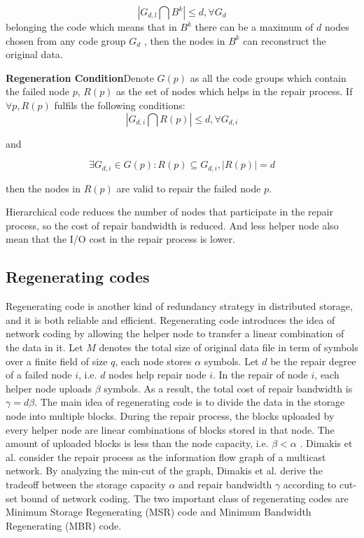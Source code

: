 \documentclass{article} %
\begin{document}
$$|G_{d, l} \bigcap B^k| \le d, \forall G_d$$
belonging the code which means that in $B^k$  there can be a maximum of $d$ nodes chosen from any code group $G_d$ , then the nodes in $B^k$ can reconstruct the original data.

\textbf{Regeneration Condition}Denote $G(p)$ as all the code groups which contain the failed node $p$, $R(p)$ as the set of nodes which helps in the repair process. If $\forall p, R(p)$ fulfils the following conditions:
$$|G_{d, i} \bigcap R(p)| \le d, \forall G_{d, i}$$

and 

$$\exists G_{d, i} \in G(p) : R(p) \subseteq G_{d, i}, |R(p)| = d$$

then the nodes in $R(p)$ are valid to repair the failed node $p$.

Hierarchical code reduces the number of nodes that participate in the repair process, so the cost of repair bandwidth is reduced. And less helper node also mean that the I/O cost in the repair process is lower.

\subsection{Regenerating codes}
Regenerating code is another kind of redundancy strategy in distributed storage, and it is both reliable and efficient. Regenerating code introduces the idea of network coding by allowing the helper node to transfer a linear combination of the data in it. Let $M$ denotes the total size of original data file in term of symbols over a finite field of size $q$, each node stores $\alpha$ symbols. Let $d$ be the repair degree of a failed node $i$, i.e. $d$ nodes help repair node $i$. In the repair of node $i$, each helper node uploads $\beta$ symbols. As a result, the total cost of repair bandwidth is $\gamma = d\beta$. The main idea of regenerating code is to divide the data in the storage node into multiple blocks. During the repair process, the blocks uploaded by every helper node are linear combinations of blocks stored in that node. The amount of uploaded blocks is less than the node capacity, i.e. $\beta < \alpha$ .  Dimakis et al. consider the repair process as the information flow graph of a multicast network. By analyzing the min-cut of the graph, Dimakis et al. derive the tradeoff between the storage capacity $\alpha$  and repair bandwidth $\gamma$  according to cut-set bound of network coding. The two important class of regenerating codes are Minimum Storage Regenerating (MSR) code and Minimum Bandwidth Regenerating (MBR) code.
\end{document}
